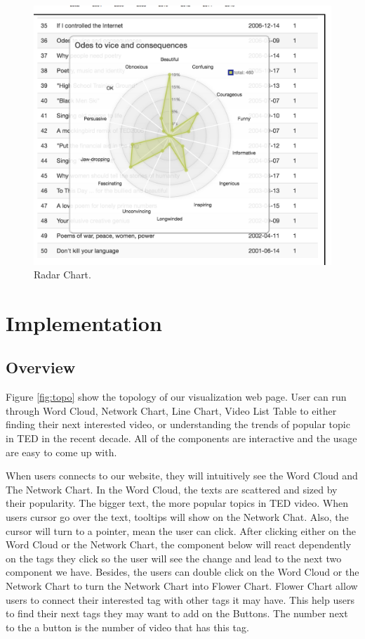 \documentclass{report}
\numberwithin{figure}{section}
\begin{document}
\begin{figure}
\begin{center}
\includegraphics[scale=0.3]{radar}
\caption{Radar Chart.}
\label{fig:radar}
\end{center}
\end{figure} 


\chapter{Implementation}
\section{Overview}
\quad Figure \ref{fig:topo} show the topology of our visualization web page. User can run through Word Cloud, Network Chart, Line Chart, Video List Table to either finding their next interested video, or understanding the trends of popular topic in TED in the recent decade. All of the components are interactive and the usage are easy to come up with.

When users connects to our website, they will intuitively see the Word Cloud and The Network Chart. In the Word Cloud, the texts are scattered and sized by their popularity. The bigger text, the more popular topics in TED video. When users cursor go over the text, tooltips will show on the Network Chat. Also, the cursor will turn to a pointer, mean the user can click. After clicking either on the Word Cloud or the Network Chart, the component below will react dependently on the tags they click so the user will see the change and lead to the next two component we have. Besides, the users can double click on the Word Cloud or the Network Chart to turn the Network Chart into Flower Chart. Flower Chart allow users to connect their interested tag with other tags it may have. This help users to find their next tags they may want to add on the Buttons. The number next to the a button is the number of video that has this tag.
\end{document}
